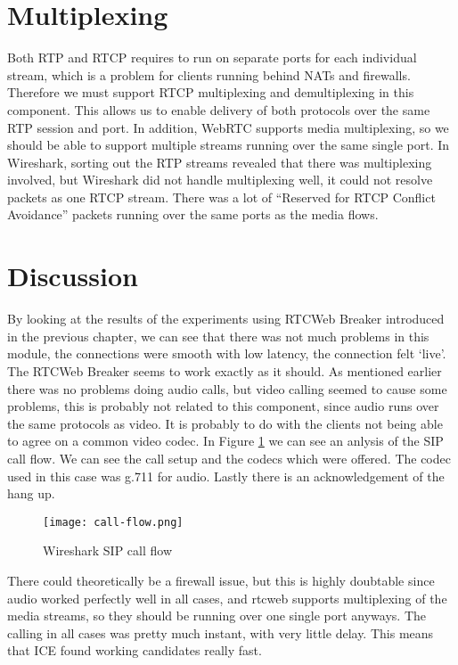\section{Multiplexing}
Both RTP and RTCP requires to run on separate ports for each individual stream, which is a problem for clients running behind NATs and firewalls. Therefore we must support RTCP multiplexing and demultiplexing in this component. This allows us to enable delivery of both protocols over the same RTP session and port. In addition, WebRTC supports media multiplexing, so we should be able to support multiple streams running over the same single port. In Wireshark, sorting out the RTP streams revealed that there was multiplexing involved, but Wireshark did not handle multiplexing well, it could not resolve packets as one RTCP stream. There was a lot of ``Reserved for RTCP Conflict Avoidance'' packets running over the same ports as the media flows.

\section{Discussion}
By looking at the results of the experiments using RTCWeb Breaker introduced in the previous chapter, we can see that there was not much problems in this module, the connections were smooth with low latency, the connection felt `live'. The RTCWeb Breaker seems to work exactly as it should. As mentioned earlier there was no problems doing audio calls, but video calling seemed to cause some problems, this is probably not related to this component, since audio runs over the same protocols as video. It is probably to do with the clients not being able to agree on a common video codec. In Figure \ref{fig:wireshark-sip-call-flow} we can see an anlysis of the SIP call flow. We can see the call setup and the codecs which were offered. The codec used in this case was g.711 for audio. Lastly there is an acknowledgement of the hang up.

\begin{figure}[here]
\centerline{\texttt{[image: call-flow.png]}}
\caption{Wireshark SIP call flow}
\label{fig:wireshark-sip-call-flow}
\end{figure}

There could theoretically be a firewall issue, but this is highly doubtable since audio worked perfectly well in all cases, and \gls{rtcweb} supports multiplexing of the media streams, so they should be running over one single port anyways. The calling in all cases was pretty much instant, with very little delay. This means that ICE found working candidates really fast.

